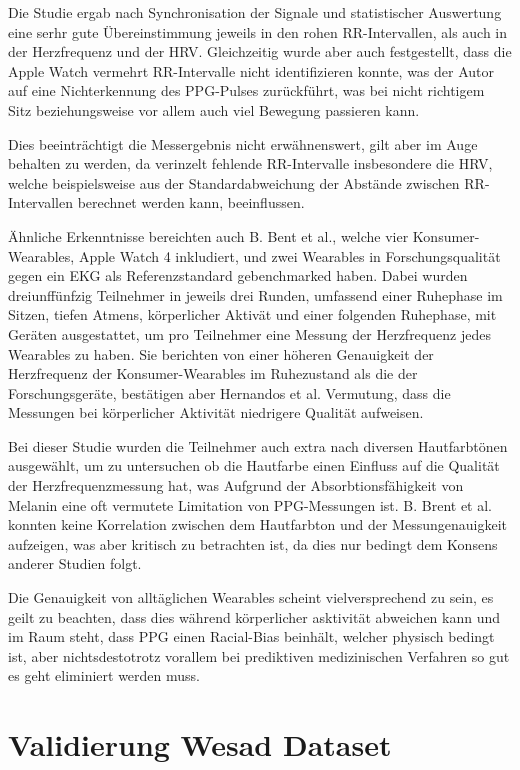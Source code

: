 Die Studie ergab nach Synchronisation der Signale und statistischer Auswertung eine serhr gute Übereinstimmung jeweils in den rohen RR-Intervallen, als auch in der Herzfrequenz und der \ac{HRV}. Gleichzeitig wurde aber auch festgestellt, dass die Apple Watch vermehrt RR-Intervalle nicht identifizieren konnte, was der Autor auf eine Nichterkennung des \ac{PPG}-Pulses zurückführt, was bei nicht richtigem Sitz beziehungsweise vor allem auch viel Bewegung passieren kann. 

Dies beeinträchtigt die Messergebnis nicht erwähnenswert, gilt aber im Auge behalten zu werden, da verinzelt fehlende RR-Intervalle insbesondere die \ac{HRV}, welche beispielsweise aus der Standardabweichung der Abstände zwischen RR-Intervallen berechnet werden kann, beeinflussen. \cite{s18082619}

Ähnliche Erkenntnisse bereichten auch B. Bent et al., welche vier Konsumer-Wearables, Apple Watch 4 inkludiert, und zwei Wearables in Forschungsqualität gegen ein \ac{EKG} als Referenzstandard gebenchmarked haben. Dabei wurden dreiunffünfzig Teilnehmer in jeweils drei Runden, umfassend einer Ruhephase im Sitzen, tiefen Atmens, körperlicher Aktivät und einer folgenden Ruhephase, mit Geräten ausgestattet, um pro Teilnehmer eine Messung der Herzfrequenz jedes Wearables zu haben. 
Sie berichten von einer höheren Genauigkeit der Herzfrequenz der Konsumer-Wearables im Ruhezustand als die der Forschungsgeräte, bestätigen aber Hernandos et al. Vermutung, dass die Messungen bei körperlicher Aktivität niedrigere Qualität aufweisen. \cite{Bent2020}

Bei dieser Studie wurden die Teilnehmer auch extra nach diversen Hautfarbtönen ausgewählt, um zu untersuchen ob die Hautfarbe einen Einfluss auf die Qualität der Herzfrequenzmessung hat, was Aufgrund der Absorbtionsfähigkeit von Melanin eine oft vermutete Limitation von \ac{PPG}-Messungen ist. B. Brent et al. konnten keine Korrelation zwischen dem Hautfarbton und der Messungenauigkeit aufzeigen, was aber kritisch zu betrachten ist, da dies nur bedingt dem Konsens anderer Studien folgt.

Die Genauigkeit von alltäglichen Wearables scheint vielversprechend zu sein, es geilt zu beachten, dass dies während körperlicher asktivität abweichen kann und im Raum steht, dass \ac{PPG} einen Racial-Bias beinhält, welcher physisch bedingt ist, aber nichtsdestotrotz vorallem bei prediktiven medizinischen Verfahren so gut es geht eliminiert werden muss.

\section{Validierung Wesad Dataset}

